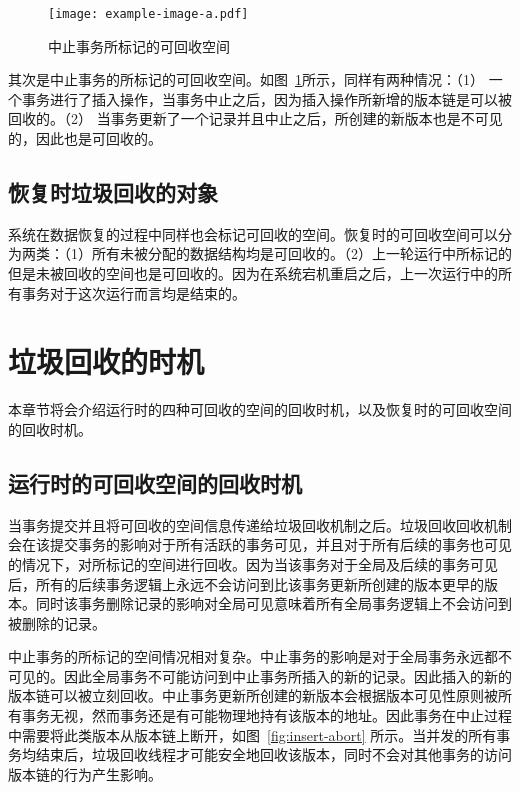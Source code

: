 \begin{figure}
    \centering
    \texttt{[image: example-image-a.pdf]}
    \caption{中止事务所标记的可回收空间}
    \label{fig:space-abort}
\end{figure}

其次是中止事务的所标记的可回收空间。如图~\ref{fig:space-abort}所示，同样有两种情况：（1） 一个事务进行了插入操作，当事务中止之后，因为插入操作所新增的版本链是可以被回收的。（2） 当事务更新了一个记录并且中止之后，所创建的新版本也是不可见的，因此也是可回收的。

\subsection{恢复时垃圾回收的对象}

系统在数据恢复的过程中同样也会标记可回收的空间。恢复时的可回收空间可以分为两类：（1）所有未被分配的数据结构均是可回收的。（2）上一轮运行中所标记的但是未被回收的空间也是可回收的。因为在系统宕机重启之后，上一次运行中的所有事务对于这次运行而言均是结束的。

\section{垃圾回收的时机}
\label{sec:time}


本章节将会介绍运行时的四种可回收的空间的回收时机，以及恢复时的可回收空间的回收时机。

\subsection{运行时的可回收空间的回收时机}

当事务提交并且将可回收的空间信息传递给垃圾回收机制之后。垃圾回收回收机制会在该提交事务的影响对于所有活跃的事务可见，并且对于所有后续的事务也可见的情况下，对所标记的空间进行回收。因为当该事务对于全局及后续的事务可见后，所有的后续事务逻辑上永远不会访问到比该事务更新所创建的版本更早的版本。同时该事务删除记录的影响对全局可见意味着所有全局事务逻辑上不会访问到被删除的记录。

中止事务的所标记的空间情况相对复杂。中止事务的影响是对于全局事务永远都不可见的。因此全局事务不可能访问到中止事务所插入的新的记录。因此插入的新的版本链可以被立刻回收。中止事务更新所创建的新版本会根据版本可见性原则被所有事务无视，然而事务还是有可能物理地持有该版本的地址。因此事务在中止过程中需要将此类版本从版本链上断开，如图~\ref{fig:insert-abort} 所示。当并发的所有事务均结束后，垃圾回收线程才可能安全地回收该版本，同时不会对其他事务的访问版本链的行为产生影响。

